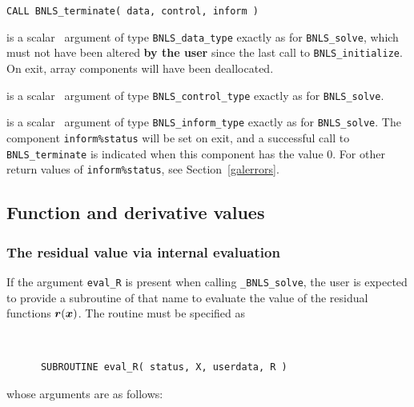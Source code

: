 \documentclass{galahad}
\newcommand{\packagename}{BNLS}
\newcommand{\fullpackagename}{\libraryname\_\packagename}
\newcommand{\solver}{{\tt \fullpackagename\_solve}}
\begin{document}
\hspace{8mm}
{\tt CALL \packagename\_terminate( data, control, inform )}

\vspace*{-1mm}
\begin{description}

 is a scalar \intentinout\ argument of type
{\tt \packagename\_data\_type}
exactly as for
{\tt \packagename\_solve},
which must not have been altered {\bf by the user} since the last call to
{\tt \packagename\_initialize}.
On exit, array components will have been deallocated.

 is a scalar \intentin\ argument of type
{\tt \packagename\_control\_type}
exactly as for
{\tt \packagename\_solve}.

 is a scalar \intentout\ argument of type
{\tt \packagename\_inform\_type}
exactly as for
{\tt \packagename\_solve}.
The component {\tt inform\%status} will be set on exit, and a
successful call to
{\tt \packagename\_terminate}
is indicated when this  component has the value 0.
For other return values of {\tt inform\%status}, see Section~\ref{galerrors}.

\end{description}


\subsection{Function and derivative values\label{fdv}}


\subsubsection{The residual value via internal evaluation\label{rfv}}

If the argument {\tt eval\_R} is present when calling \solver, the
user is expected to provide a subroutine of that name to evaluate the
value of the residual functions ${\bm{r}}({\bm{x}})$.
The routine must be specified as

\def\baselinestretch{0.8}
{\tt
\begin{verbatim}
      SUBROUTINE eval_R( status, X, userdata, R )
\end{verbatim}
}
\def\baselinestretch{1.0}
\noindent whose arguments are as follows:
\end{document}
